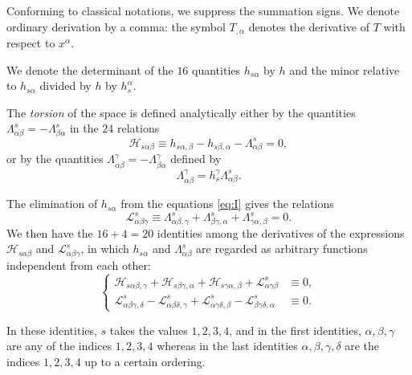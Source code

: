 \documentclass[leqno,11pt]{article}
\theoremstyle{shape1}
\theoremstyle{shape0}
\theoremstyle{shape2}
\theoremstyle{definition}
\begin{document}
Conforming to classical notations, we suppress the summation signs. We denote ordinary derivation by a comma: the symbol $T_{,\alpha}$ denotes the derivative of $T$ with respect to $x^{\alpha}$.

We denote the determinant of the $16$ quantities $h_{s\alpha}$ by $h$ and the minor relative to $h_{s\alpha}$ divided by $h$ by $h^{\alpha}_{s}$.

The \emph{torsion} of the space is defined analytically either by the quantities $\Lambda^{s}_{\alpha\beta}=-\Lambda^{s}_{\beta\alpha}$ in the $24$ relations
\begin{equation}
  \label{eq:I}\tag{I}
  \mathcal{H}_{s\alpha\beta}\equiv h_{s\alpha,\beta}-h_{s\beta,\alpha}-\Lambda^{s}_{\alpha\beta}=0,
\end{equation}
or by the quantities $\Lambda^{\gamma}_{\alpha\beta}=-\Lambda^{\gamma}_{\beta\alpha}$ defined by
\[
\Lambda^{\gamma}_{\alpha\beta}=h^{\gamma}_{s}\Lambda^{s}_{\alpha\beta}.
\]

The elimination of $h_{s\alpha}$ from the equations \eqref{eq:I} gives the relations
\begin{equation}
  \label{eq:II}\tag{II}
  \mathcal{L}^{s}_{\alpha\beta\gamma}\equiv\Lambda^{s}_{\alpha\beta,\gamma}+\Lambda^{s}_{\beta\gamma,\alpha}+\Lambda^{s}_{\gamma\alpha,\beta}=0.
\end{equation}
We then have the $16+4=20$ identities among the derivatives of the expressions $\mathcal{H}_{s\alpha\beta}$ and $\mathcal{L}^{s}_{\alpha\beta\gamma}$, in which $h_{s\alpha}$ and $\Lambda^{s}_{\alpha\beta}$ are regarded as arbitrary functions independent from each other:
\begin{equation}
  \label{eq:III}\tag{III}
  \left\{
    \begin{aligned}
      \mathcal{H}_{s\alpha\beta,\gamma}+\mathcal{H}_{s\beta\gamma,\alpha}+\mathcal{H}_{s\gamma\alpha,\beta}+\mathcal{L}^{s}_{\alpha\gamma\beta}&\equiv 0,\\
      \mathcal{L}^{s}_{\alpha\beta\gamma,\delta}-\mathcal{L}^{s}_{\alpha\beta\delta,\gamma}+\mathcal{L}^{s}_{\alpha\gamma\delta,\beta}-\mathcal{L}^{s}_{\beta\gamma\delta,\alpha}&\equiv 0.
    \end{aligned}
  \right.
\end{equation}

In these identities, $s$ takes the values $1,2,3,4$, and in the first identities, $\alpha,\beta,\gamma$ are any of the indices $1,2,3,4$ whereas in the last identities $\alpha,\beta,\gamma,\delta$ are the indices $1,2,3,4$ up to a certain ordering.
\end{document}
